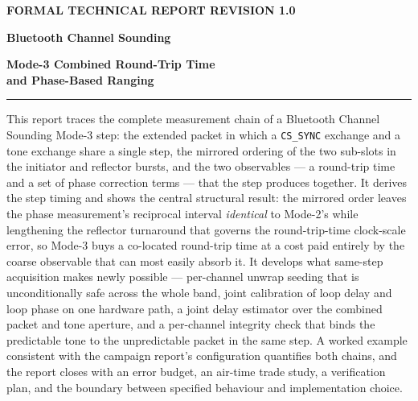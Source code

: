 \documentclass[11pt,a4paper]{article}
\newcommand{\code}[1]{\texttt{\small #1}}
\begin{document}
\thispagestyle{empty}
\vspace*{18mm}
{\color{accent}\small\bfseries FORMAL TECHNICAL REPORT \hfill REVISION 1.0}

\vspace{26mm}
{\raggedright\color{navy}\Huge\bfseries Bluetooth Channel Sounding\par}
\vspace{5mm}
{\raggedright\color{navy}\huge\bfseries Mode-3 Combined Round-Trip Time\\[2mm] and Phase-Based Ranging\par}

\vspace{7mm}

\vspace{12mm}
\noindent\rule{\textwidth}{1pt}

\vspace{4mm}
\noindent
This report traces the complete measurement chain of a Bluetooth Channel Sounding Mode-3 step: the
extended packet in which a \code{CS\_SYNC} exchange and a tone exchange share a single step, the
mirrored ordering of the two sub-slots in the initiator and reflector bursts, and the two
observables --- a round-trip time and a set of phase correction terms --- that the step produces
together. It derives the step timing and shows the central structural result: the mirrored order
leaves the phase measurement's reciprocal interval \emph{identical} to Mode-2's while lengthening the
reflector turnaround that governs the round-trip-time clock-scale error, so Mode-3 buys a co-located
round-trip time at a cost paid entirely by the coarse observable that can most easily absorb it. It
develops what same-step acquisition makes newly possible --- per-channel unwrap seeding that is
unconditionally safe across the whole band, joint calibration of loop delay and loop phase on one
hardware path, a joint delay estimator over the combined packet and tone aperture, and a per-channel
integrity check that binds the predictable tone to the unpredictable packet in the same step. A
worked example consistent with the campaign report's configuration quantifies both chains, and the
report closes with an error budget, an air-time trade study, a verification plan, and the boundary
between specified behaviour and implementation choice.
\end{document}
